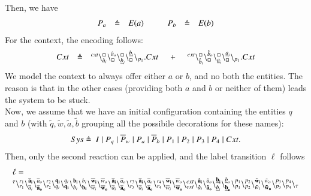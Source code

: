 Then, we have
\[
\begin{array}{lcl @{\hspace{1cm}}lcl}
P_a & \defeq & E(a) & P_b& \defeq & E(b)\\
\end{array}
\]
For the context, the encoding follows:
\[
\begin{array}{lcl @{\hspace{0.5cm}}c@{\hspace{0.5cm}} l}
Cxt &\defeq &  \startchain{cxt}\chainedlink{\hat{a}_i}{\noact}\chainedlink{\noact}{\hat{a}_o}\chainedlink{\underline{b}_i}{\noact}\chainedlink{\noact}{\underline{b}_i}\chainend{p_1}.Cxt
&+
&\startchain{cxt}\chainedlink{\hat{b}_i}{\noact}\chainedlink{\noact}{\hat{b}_o}\chainedlink{\underline{a}_i}{\noact}\chainedlink{\noact}{\underline{a}_i}\chainend{p_1}.Cxt\\
\end{array}
\]
We model the context to always offer either  $a$ or $b$, and no both the entities. The reason is that in
the other cases (providing both $a$ and $b$ or neither of them) leads the system to be stuck.\\
Now, we assume that we have an initial configuration containing the entities $q$ and $b$ (with $\tilde{q},\tilde{w},\tilde{a},\tilde{b}$ grouping all the possibile decorations for these names):
\[
\begin{array}{lcl}
Sys  \defeq \ %
 I\mid P_q \mid \overline{P}_w  \mid  P_a  \mid \overline{P}_b  \mid  P_1  \mid  P_2  \mid  P_3  \mid P_4  \mid Cxt.
\end{array}
\] 
Then, only the second reaction can be applied, and the label transition $\ell$ follows
{\tiny
\[
\begin{array}{l}
\ell = \\
 {}^{\tau}\backslash_{r_1}^{r_1}
 \backslash_{\overline{a}_i}^{\bf  \overline{a}_i}\backslash_{\bf \overline{a}_o}^{\overline{a}_o}\backslash_{r_2}^{r_2}\backslash_{q_i}^{\bf q_i}\backslash_{\bf q_i}^{q_i}\backslash_{b_i}^{\bf b_i}\backslash_{\bf b_i}^{b_i}\backslash_{\overline{w}_i}^{\bf \overline{w}_i}\backslash_{\bf \overline{w}_o}^{\overline{w}_o}\backslash_{\overline{a}_i}^{\bf \overline{a}_i}\backslash_{\bf \overline{a}_o}^{\overline{a}_o}\backslash_{r_3}^{r_3}\backslash_{\overline{a}_i}^{\bf \overline{a}_i}\backslash_{\bf \overline{a}_o}^{\overline{a}_o}\backslash_{r_4}^{r_4}\backslash_{\overline{w}_i}^{\bf \overline{w}_i}\backslash_{\bf \overline{w}_o}^{\overline{w}_o}\backslash_{cxt}^{cxt}\backslash_{\hat{a}_i}^{\bf \hat{a}_i}\backslash_{\bf \hat{a}_o}^{\hat{a}_o}\backslash_{\underline{b}_i}^{\bf \underline{b}_i}\backslash_{\bf \underline{b}_o}^{\underline{b}_o}\backslash_{p_1}^{p_1}\backslash_{p_2}^{p_2}\backslash_{\tilde{w}_i}^{\bf \tilde{w}_i}\backslash_{\bf \tilde{w}_o}^{\tilde{w}_o}\backslash_{p_3}^{p_3}\backslash_{p_4}^{p_4}\backslash_{\tau}
\end{array}
\]}
